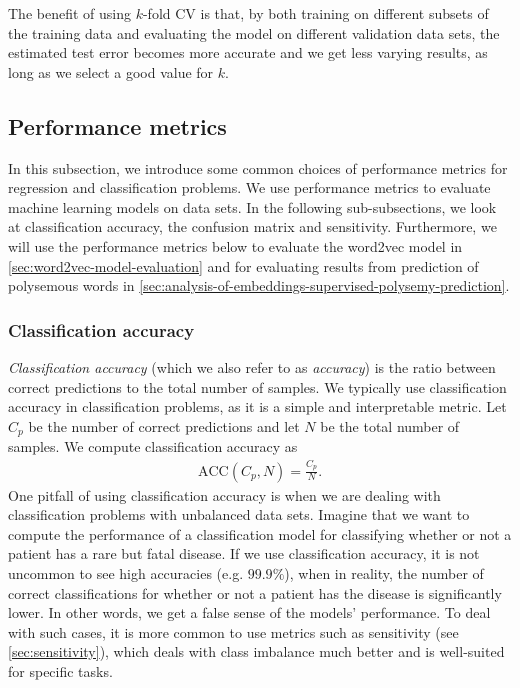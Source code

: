 The benefit of using $k$-fold CV is that, by both training on different subsets of the training data and evaluating the model on different validation data sets, the estimated test error becomes more accurate and we get less varying results, as long as we select a good value for $k$.

\subsection{Performance metrics}
\label{sec:performance-metrics}
In this subsection, we introduce some common choices of performance metrics for regression and classification problems. We use performance metrics to evaluate machine learning models on data sets. In the following sub-subsections, we look at classification accuracy, the confusion matrix and sensitivity. Furthermore, we will use the performance metrics below to evaluate the word2vec model in \cref{sec:word2vec-model-evaluation} and for evaluating results from prediction of polysemous words in \cref{sec:analysis-of-embeddings-supervised-polysemy-prediction}.

\subsubsection{Classification accuracy}
\label{sec:classification-accuracy}
\textit{Classification accuracy} (which we also refer to as \textit{accuracy}) is the ratio between correct predictions to the total number of samples. We typically use classification accuracy in classification problems, as it is a simple and interpretable metric. Let $C_p$ be the number of correct predictions and let $N$ be the total number of samples. We compute classification accuracy as
\begin{align}
    \text{ACC}(C_p, N) = \frac{C_p}{N}.
    \label{eqn:classification-accuracy}
\end{align}
One pitfall of using classification accuracy is when we are dealing with classification problems with unbalanced data sets. Imagine that we want to compute the performance of a classification model for classifying whether or not a patient has a rare but fatal disease. If we use classification accuracy, it is not uncommon to see high accuracies (e.g. $99.9\%$), when in reality, the number of correct classifications for whether or not a patient has the disease is significantly lower. In other words, we get a false sense of the models' performance. To deal with such cases, it is more common to use metrics such as sensitivity (see \cref{sec:sensitivity}), which deals with class imbalance much better and is well-suited for specific tasks.

